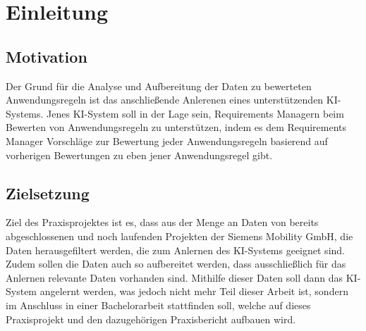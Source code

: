 \chapter{Einleitung}
\label{chap:einleitung}


\section{Motivation}
Der Grund für die Analyse und Aufbereitung der Daten zu bewerteten Anwendungsregeln ist das anschließende Anlerenen eines unterstützenden KI-Systems. Jenes KI-System soll in der Lage sein,
Requirements Managern beim Bewerten von Anwendungsregeln zu unterstützen, indem es dem Requirements Manager Vorschläge zur Bewertung jeder Anwendungsregeln basierend auf vorherigen Bewertungen zu
eben jener Anwendungsregel gibt.

\section{Zielsetzung}
\label{chap:Zielsetzung}
Ziel des Praxisprojektes ist es, dass aus der Menge an Daten von bereits abgeschlossenen und noch laufenden Projekten der Siemens Mobility GmbH, die Daten herausgefiltert werden, die 
zum Anlernen des KI-Systems geeignet sind. Zudem sollen die Daten auch so aufbereitet werden, dass ausschließlich für das Anlernen relevante Daten vorhanden sind. Mithilfe dieser Daten
soll dann das KI-System angelernt werden, was jedoch nicht mehr Teil dieser Arbeit ist, sondern im Anschluss in einer Bachelorarbeit stattfinden soll, welche auf dieses Praxisprojekt und den 
dazugehörigen Praxisbericht aufbauen wird.

